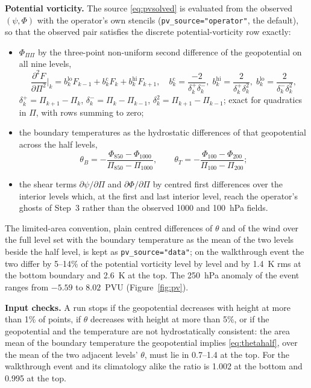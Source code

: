 \documentclass[11pt,a4paper]{article}
\newcommand{\ddd}[2]{\frac{\partial^2 #1}{\partial #2^2}}
\newcommand{\code}[1]{\texttt{#1}}
\begin{document}
\textbf{Potential vorticity.} The source \eqref{eq:pvsolved} is evaluated from
the observed $(\psi,\Phi)$ with the operator's own stencils
(\code{pv\_source="operator"}, the default), so that the observed pair
satisfies the discrete potential-vorticity row exactly:
\begin{itemize}
\itemsep0.1em
\item $\Phi_{\Pi\Pi}$ by the three-point non-uniform second difference of the
      geopotential on all nine levels,
      \begin{equation}
      \ddd{F}{\Pi}\bigg|_k = b^{\text{lo}}_k F_{k-1} + b^{\text{c}}_k F_k + b^{\text{hi}}_k F_{k+1},
      \quad
      b^{\text{c}}_k = \frac{-2}{\delta^{+}_k\delta^{-}_k},\;
      b^{\text{hi}}_k = \frac{2}{\delta^{+}_k\delta^{2}_k},\;
      b^{\text{lo}}_k = \frac{2}{\delta^{-}_k\delta^{2}_k},
      \label{eq:stencil}
      \end{equation}
      $\delta^{+}_k=\Pi_{k+1}-\Pi_k$, $\delta^{-}_k=\Pi_k-\Pi_{k-1}$,
      $\delta^{2}_k=\Pi_{k+1}-\Pi_{k-1}$; exact for quadratics in $\Pi$, with
      rows summing to zero;
\item the boundary temperatures as the hydrostatic differences of that
      geopotential across the half levels,
      \begin{equation}
      \theta_B = -\frac{\Phi_{850}-\Phi_{1000}}{\Pi_{850}-\Pi_{1000}},
      \qquad
      \theta_T = -\frac{\Phi_{100}-\Phi_{200}}{\Pi_{100}-\Pi_{200}} ;
      \label{eq:thetahalf}
      \end{equation}
\item the shear terms $\partial\psi/\partial\Pi$ and $\partial\Phi/\partial\Pi$
      by centred first differences over the interior levels which, at the first
      and last interior level, reach the operator's ghosts of Step~3 rather than
      the observed 1000 and 100~hPa fields.
\end{itemize}
The limited-area convention, plain centred differences of $\theta$ and of the
wind over the full level set with the boundary temperature as the mean of the
two levels beside the half level, is kept as \code{pv\_source="data"}; on the
walkthrough event the two differ by 5--14\% of the potential vorticity level
by level and by 1.4~K rms at the bottom boundary and 2.6~K at the top. The
250~hPa anomaly of the event ranges from $-5.59$ to $8.02$~PVU
(Figure~\ref{fig:pv}).

\textbf{Input checks.} A run stops if the geopotential decreases with height
at more than 1\% of points, if $\theta$ decreases with height at more than
5\%, or if the geopotential and the temperature are not hydrostatically
consistent: the area mean of the boundary temperature the geopotential implies
\eqref{eq:thetahalf}, over the mean of the two adjacent levels' $\theta$, must
lie in 0.7--1.4 at the top. For the walkthrough event and its climatology
alike the ratio is 1.002 at the bottom and 0.995 at the top.
\end{document}
